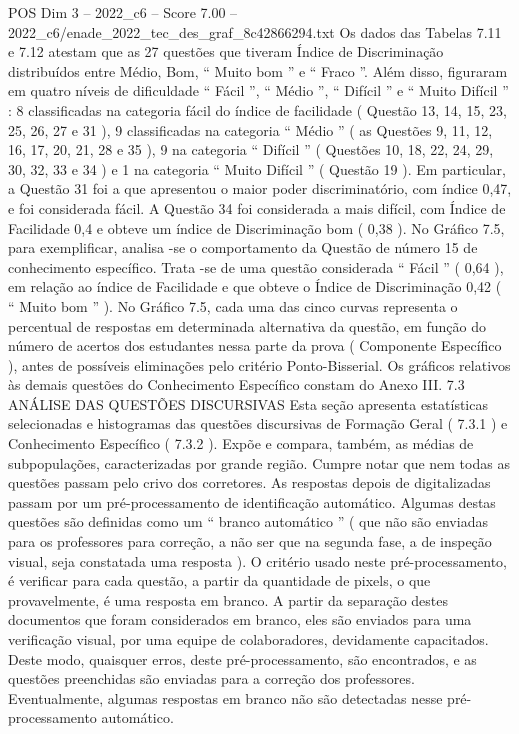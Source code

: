 \begin{textsample}{POS Dim 3 – 2022\_c6 – Score 7.00 – 2022\_c6/enade\_2022\_tec\_des\_graf\_8c42866294.txt}
Os dados das Tabelas 7.11 e 7.12 atestam que as 27 questões que tiveram Índice de Discriminação distribuídos entre Médio, Bom, “ Muito bom ” e “ Fraco ”.
Além disso, figuraram em quatro níveis de dificuldade “ Fácil ”, “ Médio ”, “ Difícil ” e “ Muito Difícil ” : 8 classificadas na categoria fácil do índice de facilidade ( Questão 13, 14, 15, 23, 25, 26, 27 e 31 ), 9 classificadas na categoria “ Médio ” ( as Questões 9, 11, 12, 16, 17, 20, 21, 28 e 35 ), 9 na categoria “ Difícil ” ( Questões 10, 18, 22, 24, 29, 30, 32, 33 e 34 ) e 1 na categoria “ Muito Difícil ” ( Questão 19 ).
Em particular, a Questão 31 foi a que apresentou o maior poder discriminatório, com índice 0,47, e foi considerada fácil.
A Questão 34 foi considerada a mais difícil, com Índice de Facilidade 0,4 e obteve um índice de Discriminação bom ( 0,38 ).
No Gráfico 7.5, para exemplificar, analisa -se o comportamento da Questão de número 15 de conhecimento específico.
Trata -se de uma questão considerada “ Fácil ” ( 0,64 ), em relação ao índice de Facilidade e que obteve o Índice de Discriminação 0,42 ( “ Muito bom ” ).
No Gráfico 7.5, cada uma das cinco curvas representa o percentual de respostas em determinada alternativa da questão, em função do número de acertos dos estudantes nessa parte da prova ( Componente Específico ), antes de possíveis eliminações pelo critério Ponto-Bisserial.
Os gráficos relativos às demais questões do Conhecimento Específico constam do Anexo III. 7.3 ANÁLISE DAS QUESTÕES DISCURSIVAS Esta seção apresenta estatísticas selecionadas e histogramas das questões discursivas de Formação Geral ( 7.3.1 ) e Conhecimento Específico ( 7.3.2 ).
Expõe e compara, também, as médias de subpopulações, caracterizadas por grande região.
Cumpre notar que nem todas as questões passam pelo crivo dos corretores.
As respostas depois de digitalizadas passam por um pré-processamento de identificação automático.
Algumas destas questões são definidas como um “ branco automático ” ( que não são enviadas para os professores para correção, a não ser que na segunda fase, a de inspeção visual, seja constatada uma resposta ).
O critério usado neste pré-processamento, é verificar para cada questão, a partir da quantidade de pixels, o que provavelmente, é uma resposta em branco.
A partir da separação destes documentos que foram considerados em branco, eles são enviados para uma verificação visual, por uma equipe de colaboradores, devidamente capacitados.
Deste modo, quaisquer erros, deste pré-processamento, são encontrados, e as questões preenchidas são enviadas para a correção dos professores.
Eventualmente, algumas respostas em branco não são detectadas nesse pré-processamento automático.

\end{textsample}
